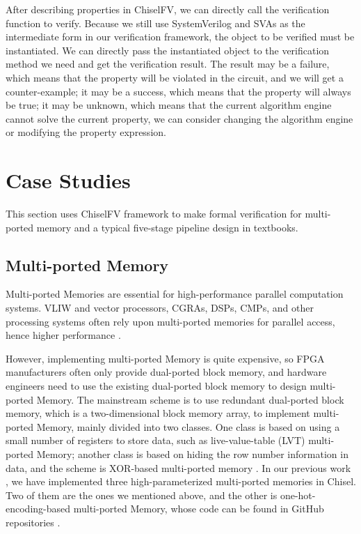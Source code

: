 \documentclass[conference]{IEEEtran}
\theoremstyle{definition}
\begin{document}
After describing properties in ChiselFV, we can directly call the verification function to verify. Because we still use SystemVerilog and SVAs as the intermediate form in our verification framework, the object to be verified must be instantiated. We can directly pass the instantiated object to the verification method we need and get the verification result. The result may be a failure, which means that the property will be violated in the circuit, and we will get a counter-example; it may be a success, which means that the property will always be true; it may be unknown, which means that the current algorithm engine cannot solve the current property, we can consider changing the algorithm engine or modifying the property expression.

\section{Case Studies}

This section uses ChiselFV framework to make formal verification for multi-ported memory and a typical five-stage pipeline design in textbooks.

\subsection{Multi-ported Memory}

Multi-ported Memories are essential for high-performance parallel computation systems. VLIW and vector processors, CGRAs, DSPs, CMPs, and other processing systems often rely upon multi-ported memories for parallel access, hence higher performance \cite{abdelhadi2014modular}. 

However, implementing multi-ported Memory is quite expensive, so FPGA manufacturers often only provide dual-ported block memory, and hardware engineers need to use the existing dual-ported block memory to design multi-ported Memory. The mainstream scheme is to use redundant dual-ported block memory, which is a two-dimensional block memory array, to implement multi-ported Memory, mainly divided into two classes. One class is based on using a small number of registers to store data, such as live-value-table (LVT) multi-ported Memory; another class is based on hiding the row number information in data, and the scheme is XOR-based multi-ported memory \cite{laforest2012multi}. 
In our previous work \cite{xiang2022parameterized}, we have implemented three high-parameterized multi-ported memories in Chisel. Two of them are the ones we mentioned above, and the other is one-hot-encoding-based multi-ported Memory, whose code can be found in GitHub repositories \cite{mpMemory}.
\end{document}
